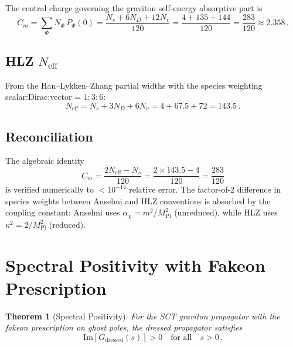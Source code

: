 \documentclass[11pt,a4paper]{article}
\newcommand{\Imag}{\mathrm{Im}}
\newcommand{\MPl}{M_{\mathrm{Pl}}}
\newcommand{\Neff}{N_{\mathrm{eff}}}
\newtheorem{theorem}{Theorem}[section]
\begin{document}
The central charge governing the graviton self-energy absorptive part is
\begin{equation}\label{eq:Cm}
  C_m = \sum_\Phi N_\Phi\,P_\Phi(0)
  = \frac{N_s + 6N_D + 12N_v}{120}
  = \frac{4 + 135 + 144}{120}
  = \frac{283}{120} \approx 2.358\,.
\end{equation}

\subsection{HLZ $\Neff$}

From the Han--Lykken--Zhang partial widths with the species weighting
scalar:Dirac:vector = $1{:}3{:}6$:
\begin{equation}\label{eq:Neff}
  \Neff = N_s + 3N_D + 6N_v = 4 + 67.5 + 72 = 143.5\,.
\end{equation}

\subsection{Reconciliation}

The algebraic identity
\begin{equation}\label{eq:reconciliation}
  C_m = \frac{2\Neff - N_s}{120} = \frac{2 \times 143.5 - 4}{120} = \frac{283}{120}
\end{equation}
is verified numerically to $< 10^{-14}$ relative error.  The factor-of-2
difference in species weights between Anselmi and HLZ conventions is absorbed
by the coupling constant: Anselmi uses $\alpha_\chi = m^2/\MPl^2$ (unreduced),
while HLZ uses $\kappa^2 = 2/\MPl^2$ (reduced).


\section{Spectral Positivity with Fakeon Prescription}
\label{sec:spectral}

\begin{theorem}[Spectral Positivity]\label{thm:spectral}
For the SCT graviton propagator with the fakeon prescription on ghost poles,
the dressed propagator satisfies
\[
  \Imag[G_{\mathrm{dressed}}(s)] > 0 \quad\text{for all}\quad s > 0\,.
\]
\end{theorem}
\end{document}
